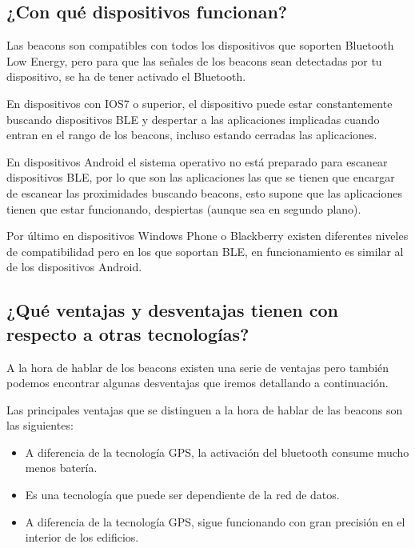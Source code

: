 \subsection{¿Con qué dispositivos funcionan?}

Las beacons son compatibles con todos los dispositivos que soporten Bluetooth Low Energy, pero para que las señales de los beacons sean detectadas por tu dispositivo, se ha de tener activado el Bluetooth. 


En dispositivos con IOS7 \cite{URL::IOS7} o superior, el dispositivo puede estar constantemente buscando dispositivos BLE y despertar a las aplicaciones implicadas cuando entran en el rango de los beacons, incluso estando cerradas las aplicaciones.


En dispositivos Android \cite{URL::Android} el sistema operativo no está preparado para escanear dispositivos BLE, por lo que son las aplicaciones las que se tienen que encargar de escanear las proximidades buscando beacons, esto supone que las aplicaciones tienen que estar funcionando, despiertas (aunque sea en segundo plano).

Por último en dispositivos Windows Phone \cite{URL:WindowsPhone} o Blackberry \cite{URL:Blackberry} existen diferentes niveles de compatibilidad pero en los que soportan BLE, en funcionamiento es similar al de los dispositivos Android. 

\subsection{¿Qué ventajas y desventajas tienen con respecto a otras tecnologías?}

A la hora de hablar de los beacons existen una serie de ventajas pero también podemos encontrar algunas desventajas que iremos detallando a continuación. 


Las principales ventajas que se distinguen a la hora de hablar de las beacons son las siguientes: 

\begin{itemize}
\item A diferencia de la tecnología GPS, la activación del bluetooth consume mucho menos batería. 
\item Es una tecnología que puede ser dependiente de la red de datos. 
\item A diferencia de la tecnología GPS, sigue funcionando con gran precisión en el interior de los edificios.
\end{itemize}

